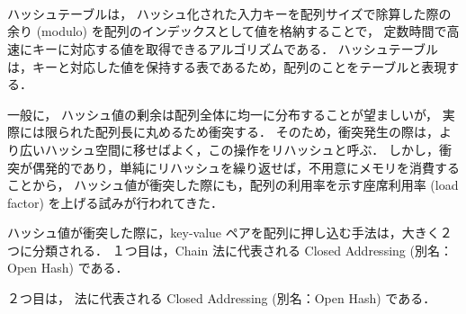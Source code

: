 \thispagestyle{empty} %

　\\
\\
\\
\\
\\
\\
\\
\\

ハッシュテーブルは，
ハッシュ化された入力キーを配列サイズで除算した際の余り (modulo) を配列のインデックスとして値を格納することで，
定数時間で高速にキーに対応する値を取得できるアルゴリズムである．
ハッシュテーブルは，キーと対応した値を保持する表であるため，配列のことをテーブルと表現する．

一般に，
ハッシュ値の剰余は配列全体に均一に分布することが望ましいが，
実際には限られた配列長に丸めるため衝突する．
そのため，衝突発生の際は，より広いハッシュ空間に移せばよく，この操作をリハッシュと呼ぶ．
しかし，衝突が偶発的であり，単純にリハッシュを繰り返せば，不用意にメモリを消費することから，
ハッシュ値が衝突した際にも，配列の利用率を示す座席利用率 (load factor) を上げる試みが行われてきた．

ハッシュ値が衝突した際に，key-value ペアを配列に押し込む手法は，大きく２つに分類される．
１つ目は，Chain 法に代表される Closed Addressing (別名：Open Hash) である．


２つ目は， 法に代表される Closed Addressing (別名：Open Hash) である．




